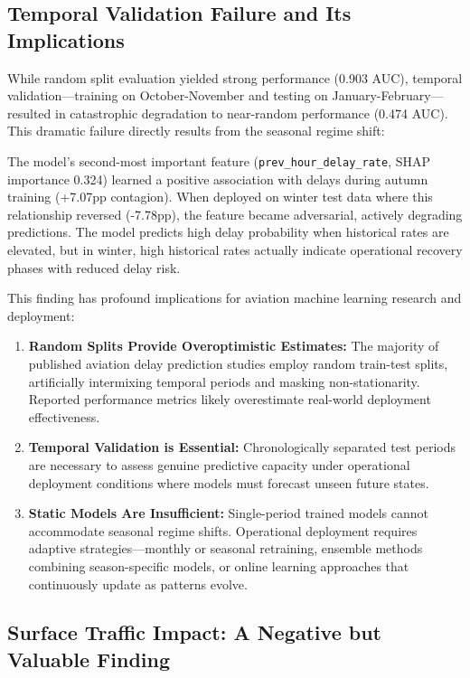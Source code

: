 \documentclass{report}
\begin{document}
\subsection{Temporal Validation Failure and Its Implications}
\label{sec:tvfailure}
While random split evaluation yielded strong performance (0.903 AUC), temporal validation—training on October-November and testing on January-February—resulted in catastrophic degradation to near-random performance (0.474 AUC). This dramatic failure directly results from the seasonal regime shift:

The model's second-most important feature (\texttt{prev\_hour\_delay\_rate}, SHAP importance 0.324) learned a positive association with delays during autumn training (+7.07pp contagion). When deployed on winter test data where this relationship reversed (-7.78pp), the feature became adversarial, actively degrading predictions. The model predicts high delay probability when historical rates are elevated, but in winter, high historical rates actually indicate operational recovery phases with reduced delay risk.

This finding has profound implications for aviation machine learning research and deployment:

\begin{enumerate}
    \item \textbf{Random Splits Provide Overoptimistic Estimates:} The majority of published aviation delay prediction studies employ random train-test splits, artificially intermixing temporal periods and masking non-stationarity. Reported performance metrics likely overestimate real-world deployment effectiveness.
    
    \item \textbf{Temporal Validation is Essential:} Chronologically separated test periods are necessary to assess genuine predictive capacity under operational deployment conditions where models must forecast unseen future states.
    
    \item \textbf{Static Models Are Insufficient:} Single-period trained models cannot accommodate seasonal regime shifts. Operational deployment requires adaptive strategies—monthly or seasonal retraining, ensemble methods combining season-specific models, or online learning approaches that continuously update as patterns evolve.
\end{enumerate}

\subsection{Surface Traffic Impact: A Negative but Valuable Finding}
\end{document}
